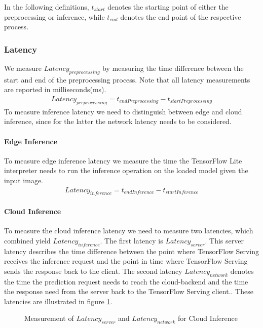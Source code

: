 In the following definitions, $t_{start}$ denotes the starting point of either the preprocessing or inference, while $t_{end}$ denotes the end point of the respective process.
\subsubsection{Latency}
We measure $Latency_{preprocessing}$ by measuring the time difference between the start and end of the preprocessing process.
Note that all latency measurements are reported in milliseconds(ms).
\begin{equation*}
\begin{gathered}
Latency_{preprocessing} = t_{endPreprocessing} - t_{startPreprocessing}
\end{gathered}
\end{equation*}
To measure inference latency we need to distinguish between edge and cloud inference, since for the latter the network latency needs to be considered.

\paragraph{Edge Inference}To measure edge inference latency we measure the time the TensorFlow Lite interpreter needs to run the inference operation on the loaded model given the input image.
\begin{equation*}
\begin{gathered}
Latency_{inference} = t_{endInference} - t_{startInference}
\end{gathered}
\end{equation*}
\paragraph{Cloud Inference}
To measure the cloud inference latency we need to measure two latencies, which combined yield $Latency_{inference}$. The first latency is  $Latency_{server}$. This server latency describes the time difference between the point where TensorFlow Serving receives the inference request and the point in time where TensorFlow Serving sends the response back to the client.
The second latency $Latency_{network}$ denotes the time the prediction request needs to reach the cloud-backend and the time the response need from the server back to the TensorFlow Serving client..
These latencies are illustrated in figure \ref{fig:serverLat}.
\begin{figure}[!htb]
\centering

\caption{Measurement of $Latency_{server}$ and $Latency_{network}$ for Cloud Inference}
\label{fig:serverLat}
\end{figure}


